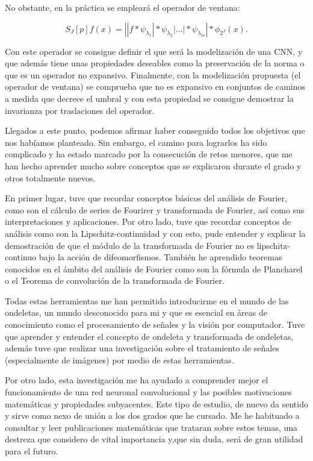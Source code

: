 \medskip

\noindent No obstante, en la práctica se empleará el operador de ventana:

\begin{equation}
  S_J[p]f(x)=\left| |f \ast \psi_{\lambda_1} | \ast \psi_{\lambda_2} | \ldots | \ast \psi_{\lambda_m} \right| \ast \phi_{2^J}(x).
\end{equation}

\noindent Con este operador se consigue definir el que será la modelización de una CNN, y que además tiene unas propiedades deseables como la preservación de la norma o que es un operador no expansivo. Finalmente, con la modelización propuesta (el operador de ventana) se comprueba que no es expansivo en conjuntos de caminos a medida que decrece el umbral y con esta propiedad se consigue demostrar la invarianza por traslaciones del operador.

\medskip

\noindent Llegados a este punto, podemos afirmar haber conseguido todos los objetivos que nos habíamos planteado. Sin embargo, el camino para lograrlos ha sido complicado y ha estado marcado por la consecución de retos menores, que me han hecho aprender mucho sobre conceptos que se explicaron durante el grado y otros totalmente nuevos.

\medskip

\noindent En primer lugar, tuve que recordar conceptos básicos del análisis de Fourier, como son el cálculo de series de Fourirer y transformada de Fourier, así como sus interpretaciones y aplicaciones. Por otro lado, tuve que recordar conceptos de análisis como son la Lipschitz-continuidad y con esto, pude entender y explicar la demostración de que el módulo de la transformada de Fourier no es lipschitz-continuo bajo la acción de difeomorfismos. También he aprendido teoremas conocidos en el ámbito del análisis de Fourier como son la fórmula de Plancharel o el Teorema de convolución de la transformada de Fourier. 

\medskip

\noindent Todas estas herramientas me han permitido introducirme en el mundo de las ondeletas, un mundo desconocido para mi y que es esencial en áreas de conocimiento como el procesamiento de señales y la visión por computador. Tuve que aprender y entender el concepto de ondeleta y transformada de ondeletas, además tuve que realizar una investigación sobre el tratamiento de señales (especialmente de imágenes) por medio de estas herramientas.

\medskip

\noindent Por otro lado, esta investigación me ha ayudado a comprender mejor el funcionamiento de una red neuronal convolucional y las posibles motivaciones matemáticas y propiedades subyacentes. Este tipo de estudio, de nuevo da sentido y sirve como nexo de unión a los dos grados que he cursado. Me he habituado a consultar y leer publicaciones matemáticas que trataran sobre estos temas, una destreza que considero de vital importancia y,que sin duda, será de gran utilidad para el futuro.

\endinput